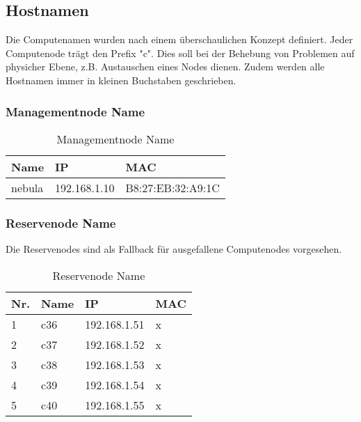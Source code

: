 \subsection{Hostnamen}
Die Computenamen wurden nach einem überschaulichen Konzept definiert. Jeder Computenode trägt den Prefix "c". Dies soll bei der Behebung von Problemen auf physicher Ebene, z.B. Austauschen eines Nodes dienen. Zudem werden alle Hostnamen immer in kleinen Buchstaben geschrieben.

\subsubsection{Managementnode Name}
\begin{table}[H]
\centering
\begin{tabular}{p{5cm}p{5.5cm}p{5.5cm}}
\hline
\rowcolor{heading} \textbf{Name} & \textbf{IP} & \textbf{MAC} \\\hline
nebula & 192.168.1.10 & B8:27:EB:32:A9:1C \\\hline
\end{tabular}
\caption{Managementnode Name}
\end{table}

\subsubsection{Reservenode Name}
Die Reservenodes sind als Fallback für ausgefallene Computenodes vorgesehen.
\begin{table}[H]
\centering
\begin{tabular}{p{1cm}p{2cm}p{6cm}p{6cm}}
\hline
\rowcolor{heading} \textbf{Nr.} & \textbf{Name} & \textbf{IP} & \textbf{MAC} \\\hline
1 & c36 & 192.168.1.51 & x\\\hline
2 & c37 & 192.168.1.52 & x\\\hline
3 & c38 & 192.168.1.53 & x\\\hline
4 & c39 & 192.168.1.54 & x\\\hline
5 & c40 & 192.168.1.55 & x\\\hline
\end{tabular}
\caption{Reservenode Name}
\end{table}

